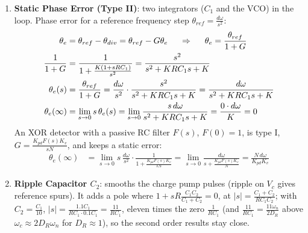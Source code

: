 \begin{enumerate}
\begin{align*}
      \omega_c &= \omega_n\sqrt{2D_R^2 + \sqrt{4D_R^4 + 1}} \hspace{0.5cm} \xrightarrow{D_R^4 \gg 1} \hspace{0.5cm} \omega_n\sqrt{2D_R^2 + 2D_R^2} = 2D_R\omega_n
    \end{align*}
    (\(D_R = 1\): \(\omega_c = 2.06\,\omega_n\), so \(\omega_c \approx 2D_R\omega_n\) already holds for
    \(D_R \gtrsim 1\)); keep \(\omega_c < \frac{2\pi f_{ref}}{10}\).
  \item \textbf{Static Phase Error (Type II)}: two integrators (\(C_1\) and the VCO) in the loop.
    Phase error for a reference frequency step \(\theta_{ref} = \frac{d\omega}{s^2}\):
    \begin{align*}
      \theta_e &= \theta_{ref} - \theta_{div} = \theta_{ref} - G\theta_e \hspace{0.5cm} \Rightarrow \hspace{0.5cm} \theta_e = \frac{\theta_{ref}}{1 + G} \\
      \frac{1}{1 + G} &= \frac{1}{1 + \frac{K(1 + sRC_1)}{s^2}} = \frac{s^2}{s^2 + K RC_1 s + K} \\
      \theta_e(s) &= \frac{\theta_{ref}}{1 + G} = \frac{d\omega}{s^2}\cdot\frac{s^2}{s^2 + K RC_1 s + K} = \frac{d\omega}{s^2 + K RC_1 s + K} \\
      \theta_e(\infty) &= \lim_{s \to 0} s\,\theta_e(s) = \lim_{s \to 0} \frac{s\, d\omega}{s^2 + KRC_1 s + K} = \frac{0 \cdot d\omega}{K} = 0
    \end{align*}
    An XOR detector with a passive RC filter \(F(s)\), \(F(0) = 1\), is type I,
    \(G = \frac{K_{pd} F(s) K_v}{sN}\), and keeps a static error:
    \begin{align*}
      \theta_e(\infty) &= \lim_{s \to 0} s\,\frac{d\omega}{s^2}\cdot\frac{1}{1 + \frac{K_{pd} F(s) K_v}{sN}}
      = \lim_{s \to 0} \frac{d\omega}{s + \frac{K_{pd} F(s) K_v}{N}} = \frac{N\, d\omega}{K_{pd} K_v}
    \end{align*}
  \item \textbf{Ripple Capacitor \(C_2\)}: smooths the charge pump pulses (ripple on \(V_c\) gives
    reference spurs). It adds a pole where \(1 + sR\frac{C_1C_2}{C_1 + C_2} = 0\), at
    \(|s| = \frac{C_1 + C_2}{RC_1 C_2}\); with \(C_2 = \frac{C_1}{10}\),
    \(|s| = \frac{1.1 C_1}{RC_1 \cdot 0.1 C_1} = \frac{11}{RC_1}\), eleven times the zero
    \(\frac{1}{RC_1}\) (and \(\frac{11}{RC_1} = \frac{11\omega_n}{2D_R}\) above \(\omega_c \approx 2D_R\omega_n\) for
    \(D_R \approx 1\)), so the second order results stay close.

\end{enumerate}
